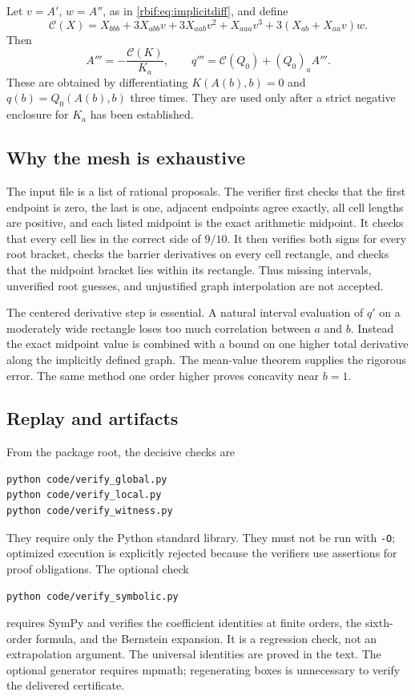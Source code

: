 \documentclass[11pt,a4paper]{article}
\theoremstyle{definition}\newtheorem{definition}[theorem]{Definition}
\theoremstyle{remark}\newtheorem{remark}[theorem]{Remark}
\numberwithin{equation}{section}
\begin{document}
Let $v=A'$, $w=A''$, as in \eqref{rbif:eq:implicitdiff}, and define
\begin{equation}
 \mathcal C(X)=X_{bbb}+3X_{abb}v+3X_{aab}v^2+X_{aaa}v^3
                   +3(X_{ab}+X_{aa}v)w.
 \label{rbif:eq:Cderiv}
\end{equation}
Then
\[
 A'''=-\frac{\mathcal C(K)}{K_a},\qquad
 q'''=\mathcal C(Q_0)+(Q_0)_aA'''.
\]
These are obtained by differentiating $K(A(b),b)=0$ and
$q(b)=Q_0(A(b),b)$ three times. They are used only after a strict
negative enclosure for $K_a$ has been established.

\subsection{Why the mesh is exhaustive}
The input file  is a list of rational proposals.
The verifier first checks that the first endpoint is zero, the last is
one, adjacent endpoints agree exactly, all cell lengths are positive,
and each listed midpoint is the exact arithmetic midpoint. It checks
that every cell lies in the correct side of $9/10$. It then verifies both
signs for every root bracket, checks the barrier derivatives on every
cell rectangle, and checks that the midpoint bracket lies within its
rectangle. Thus missing intervals, unverified root guesses, and
unjustified graph interpolation are not accepted.

The centered derivative step is essential. A natural interval evaluation
of $q'$ on a moderately wide rectangle loses too much correlation between
$a$ and $b$. Instead the exact midpoint value is combined with a bound on
one higher total derivative along the implicitly defined graph. The
mean-value theorem supplies the rigorous error. The same method one order
higher proves concavity near $b=1$.

\subsection{Replay and artifacts}
From the package root, the decisive checks are
\begin{verbatim}
python code/verify_global.py
python code/verify_local.py
python code/verify_witness.py
\end{verbatim}
They require only the Python standard library. They must not be run with
\texttt{-O}; optimized execution is explicitly rejected because the
verifiers use assertions for proof obligations. The optional check
\begin{verbatim}
python code/verify_symbolic.py
\end{verbatim}
requires SymPy and verifies the coefficient identities at finite orders,
the sixth-order formula, and the Bernstein expansion. It is a regression
check, not an extrapolation argument. The universal identities are proved
in the text. The optional generator  requires mpmath;
regenerating boxes is unnecessary to verify the delivered certificate.
\end{document}
